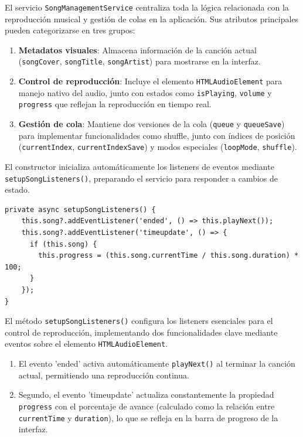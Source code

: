 \documentclass[11pt, a4paper]{article}
\begin{document}
                El servicio \verb|SongManagementService| centraliza toda la lógica relacionada con la reproducción musical y gestión de colas en la aplicación. Sus atributos principales pueden categorizarse en tres grupos:

                \begin{enumerate}
                    \item \textbf{Metadatos visuales}: Almacena información de la canción actual (\verb|songCover|, \verb|songTitle|, \verb|songArtist|) para mostrarse en la interfaz.
                    \item \textbf{Control de reproducción}: Incluye el elemento \verb|HTMLAudioElement| para manejo nativo del audio, junto con estados como \verb|isPlaying|, \verb|volume| y \verb|progress| que reflejan la reproducción en tiempo real.
                    \item \textbf{Gestión de cola}: Mantiene dos versiones de la cola (\verb|queue| y \verb|queueSave|) para implementar funcionalidades como shuffle, junto con índices de posición (\verb|currentIndex|, \verb|currentIndexSave|) y modos especiales (\verb|loopMode|, \verb|shuffle|).
                \end{enumerate}

                El constructor inicializa automáticamente los listeners de eventos mediante \verb|setupSongListeners()|, preparando el servicio para responder a cambios de estado.

                \begin{lstlisting}[caption={setUpSongListeners()}]
private async setupSongListeners() {
    this.song?.addEventListener('ended', () => this.playNext());
    this.song?.addEventListener('timeupdate', () => {
      if (this.song) {
        this.progress = (this.song.currentTime / this.song.duration) * 100;
      }
    });
}
                \end{lstlisting}

                El método \verb|setupSongListeners()| configura los listeners esenciales para el control de reproducción, implementando dos funcionalidades clave mediante eventos sobre el elemento \verb|HTMLAudioElement|.
                
                \begin{enumerate}
                    \item El evento 'ended' activa automáticamente \verb|playNext()| al terminar la canción actual, permitiendo una reproducción continua.
                    \item Segundo, el evento 'timeupdate' actualiza constantemente la propiedad \verb|progress| con el porcentaje de avance (calculado como la relación entre \verb|currentTime| y \verb|duration|), lo que se refleja en la barra de progreso de la interfaz.
                \end{enumerate}
\end{document}
